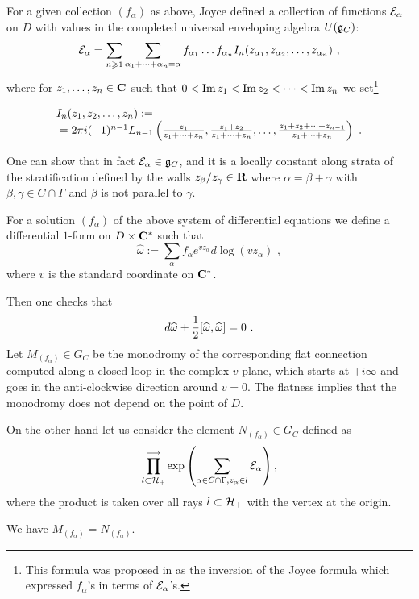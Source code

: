 \documentclass[12pt]{article}
\begin{document}
For a given collection $(f_{\alpha})$ as above, Joyce defined a collection of  functions ${\cal E}_{\alpha}$
on $D$ with values in the completed universal enveloping algebra $U({\mathfrak g}_C)$:
$${\cal E}_{\alpha}=\sum_{n\geqslant 1}\sum_{\alpha_1+\dots+\alpha_n=\alpha}f_{\alpha_1}\dots
f_{\alpha_n}I_n(z_{\alpha_1},z_{\alpha_2},\dots,z_{\alpha_n})\,\,,$$
where for  $z_1,\dots,z_n\in {\bf C}$ such that $0<\operatorname{Im}z_1<\operatorname{Im}z_2<\dots<\operatorname{Im}z_n$ we set\footnote{This formula was proposed in \cite{BrTL}
 as the inversion of the Joyce formula which expressed $f_{\alpha}$'s in terms of ${\cal E}_{\alpha}$'s.}

$$\begin{array}{l}
I_n(z_1,z_2,\dots,z_n):=\\
{}=2\pi i(-1)^{n-1} L_{n-1}\left({z_1\over{z_1+\dots+z_n}},{z_1+z_2\over{z_1+\dots+z_n}},\dots,
{z_1+z_2+\dots+z_{n-1}\over{z_1+\dots+z_n}}\right)\,\,.
\end{array}$$


One can show that in fact ${\cal E}_{\alpha}\in {\mathfrak g}_C$, and it is a locally constant along strata of the stratification defined by 
the walls $z_{\beta}/z_{\gamma}\in {\bf R}$ where $\alpha=\beta+\gamma$ with $ \beta,\gamma\in C\cap \Gamma$ and $\beta$ is not parallel to $\gamma$.



For a solution $(f_{\alpha})$ of the above system of differential equations we define
a differential $1$-form on $D\times {\bf C}^{\ast}$ such that
$$\widehat{\omega}:=\sum_{\alpha}f_{\alpha} e^{vz_{\alpha}}d\log(vz_{\alpha})\,\,,$$
where $v$ is the standard coordinate on ${\bf C}^{\ast}$.

Then one checks that 
$$d\widehat{\omega}+{1\over{2}}[\widehat{\omega},\widehat{\omega}]=0\,\,.$$
Let $M_{(f_{\alpha})}\in {G}_C$ be the monodromy of the corresponding flat connection computed
along a closed loop in the complex $v$-plane, which starts at $+i\infty$ and goes in the anti-clockwise direction around $v=0$. The flatness implies that the monodromy does not depend on the point of $D$.

On the other hand let us consider the element $N_{(f_{\alpha})}\in {G}_C$ defined as
$$\prod_{l\subset {\cal H}_+}^{\longrightarrow}\exp\left(\sum_{\alpha\in C\cap {\Gamma},z_{\alpha}\in l}{\cal E}_{\alpha}\right),$$
where the product is taken over all rays $l\subset {\cal H}_+$ with the vertex at the origin.

\begin{conj} We have $M_{(f_{\alpha})}=N_{(f_{\alpha})}$.

\end{conj}
\end{document}
